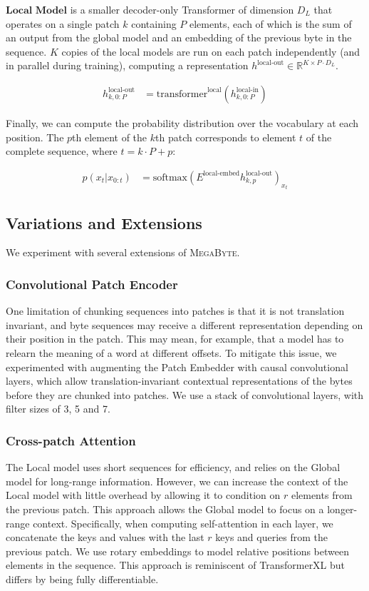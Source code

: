 $\textbf{Local Model}$  is a smaller decoder-only Transformer of dimension $D_L$ that operates on a single patch $k$ containing $P$ elements, each of which is the sum of an output from the global model and an embedding of the previous byte in the sequence. $K$ copies of the local models are run on each patch independently (and in parallel during training), computing a representation $h^\text{local-out}\in\mathbb{R}^{K\times P\cdot D_L} $.

\begin{align}
h^\text{local-out}_{k,0:P} &= \text{transformer}^{\text{local}}(h^\text{local-in}_{k,0:P}) 
\end{align}

Finally, we can compute the probability distribution over the vocabulary at each position. The $p$th element of the $k$th patch corresponds to element $t$ of the complete sequence, where $t=k\cdot P+p$:

\begin{align}
p(x_{t}|x_{0:t}) &= \text{softmax}{(E^\text{local-embed}h^\text{local-out}_{k,p})}_{x_t} 
\end{align}

\subsection{Variations and Extensions} We experiment with several extensions of \textsc{MegaByte}.

\subsubsection{Convolutional Patch Encoder}

One limitation of chunking sequences into patches is that it is not translation invariant, and byte sequences may receive a different representation depending on their position in the patch. This may mean, for example, that a model has to relearn the meaning of a word at different offsets. To mitigate this issue, we experimented with augmenting the Patch Embedder with causal convolutional layers, which allow translation-invariant contextual representations of the bytes before they are chunked into patches. We use a stack of convolutional layers, with filter sizes of 3, 5 and 7. 

\subsubsection{Cross-patch Attention} The Local model uses short sequences for efficiency, and relies on the Global model for long-range information. However, we can increase the context of the Local model with little overhead by allowing it to condition on $r$ elements from the previous patch. This approach allows the Global model to focus on a longer-range context. Specifically, when computing self-attention in each layer, we concatenate the keys and values with the last $r$ keys and queries from the previous patch. We use rotary embeddings \citep{rotary} to model relative positions between elements in the sequence. This approach is reminiscent of TransformerXL \citep{xfmxl} but differs by being fully differentiable. 

